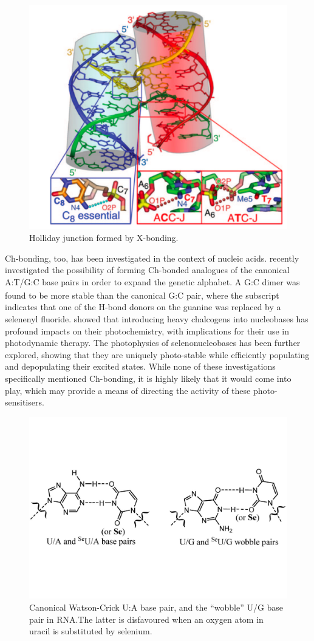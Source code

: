 \begin{refsection}
\begin{figure}
    \centering
    \includegraphics[width=0.6\linewidth]{Figures/holliday-junction.pdf}
    \caption{Holliday junction formed by X-bonding.\autocite{Voth2007}}\label{fig:holliday-junction}
\end{figure}

Ch-bonding, too, has been investigated in the context of nucleic acids.
 recently investigated the possibility of forming Ch-bonded analogues of the canonical A:T/G:C base pairs in order to expand the genetic alphabet.\autocite{Sharma2020}
A G\textsubscript{}:C dimer was found to be more stable than the canonical G:C pair, where the  subscript indicates that one of the H-bond donors on the guanine was replaced by a selenenyl fluoride.
 showed that introducing heavy chalcogens into nucleobases has profound impacts on their photochemistry, with implications for their use in photodynamic therapy.\autocite{Farrell2018}
The photophysics of selenonucleobases has been further explored, showing that they are uniquely photo-stable while efficiently populating and depopulating their excited states.\autocite{Mai2019,Peng2020,Fang2019,Uleany2020}
While none of these investigations specifically mentioned Ch-bonding, it is highly likely that it would come into play, which may provide a means of directing the activity of these photo-sensitisers.

\begin{figure}
    \centering
    \includegraphics[width=0.6\linewidth]{Figures/wobble-bp.pdf}
    \caption[Canonical Watson-Crick U/A base pair, and the ``wobble'' U:G base pair in RNA.]{Canonical Watson-Crick U:A base pair, and the ``wobble'' U/G base pair in RNA.\@ The latter is disfavoured when an oxygen atom in uracil is substituted by selenium.}\label{fig:wobble-bp}
\end{figure}


\end{refsection}
